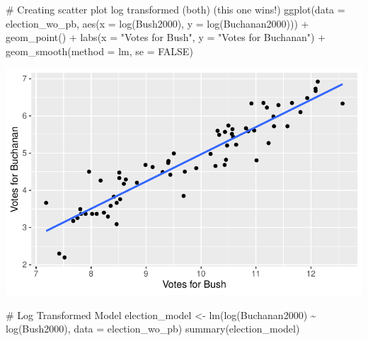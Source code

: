 \documentclass[
  letterpaper,
  DIV=11,
  numbers=noendperiod]{scrartcl}
\newenvironment{Shaded}{\begin{snugshade}}{\end{snugshade}}
\newcommand{\AttributeTok}[1]{\textcolor[rgb]{0.40,0.45,0.13}{#1}}
\newcommand{\CommentTok}[1]{\textcolor[rgb]{0.37,0.37,0.37}{#1}}
\newcommand{\ConstantTok}[1]{\textcolor[rgb]{0.56,0.35,0.01}{#1}}
\newcommand{\FunctionTok}[1]{\textcolor[rgb]{0.28,0.35,0.67}{#1}}
\newcommand{\NormalTok}[1]{\textcolor[rgb]{0.00,0.23,0.31}{#1}}
\newcommand{\OtherTok}[1]{\textcolor[rgb]{0.00,0.23,0.31}{#1}}
\newcommand{\SpecialCharTok}[1]{\textcolor[rgb]{0.37,0.37,0.37}{#1}}
\newcommand{\StringTok}[1]{\textcolor[rgb]{0.13,0.47,0.30}{#1}}
\begin{document}
\begin{Shaded}
\begin{Highlighting}[]
\CommentTok{\# Creating scatter plot log transformed (both) (this one wins!)}
\FunctionTok{ggplot}\NormalTok{(}\AttributeTok{data =}\NormalTok{ election\_wo\_pb, }\FunctionTok{aes}\NormalTok{(}\AttributeTok{x =} \FunctionTok{log}\NormalTok{(Bush2000), }\AttributeTok{y =} \FunctionTok{log}\NormalTok{(Buchanan2000))) }\SpecialCharTok{+}
  \FunctionTok{geom\_point}\NormalTok{() }\SpecialCharTok{+}
  \FunctionTok{labs}\NormalTok{(}\AttributeTok{x =} \StringTok{"Votes for Bush"}\NormalTok{, }\AttributeTok{y =} \StringTok{"Votes for Buchanan"}\NormalTok{) }\SpecialCharTok{+}
  \FunctionTok{geom\_smooth}\NormalTok{(}\AttributeTok{method =}\NormalTok{ lm, }\AttributeTok{se =} \ConstantTok{FALSE}\NormalTok{)}
\end{Highlighting}
\end{Shaded}

\includegraphics{case-study-template_files/figure-pdf/unnamed-chunk-6-9.pdf}

\begin{Shaded}
\begin{Highlighting}[]
\CommentTok{\# Log Transformed Model}
\NormalTok{election\_model }\OtherTok{\textless{}{-}} \FunctionTok{lm}\NormalTok{(}\FunctionTok{log}\NormalTok{(Buchanan2000) }\SpecialCharTok{\textasciitilde{}} \FunctionTok{log}\NormalTok{(Bush2000), }\AttributeTok{data =}\NormalTok{ election\_wo\_pb)}
\FunctionTok{summary}\NormalTok{(election\_model)}
\end{Highlighting}
\end{Shaded}
\end{document}
